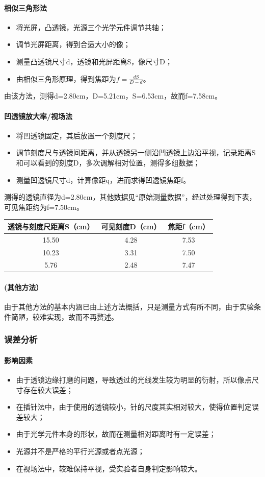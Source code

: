 \documentclass[UTF8]{ctexart}
\begin{document}
\paragraph{相似三角形法}
\begin{itemize}
\item 将光屏，凸透镜，光源三个光学元件调节共轴；
\item 调节光屏距离，得到合适大小的像；
\item 测量凸透镜尺寸d，透镜和光屏距离S，像尺寸D；
\item 由相似三角形原理，得到焦距为$f=\frac{dS}{D-d}$。
\end{itemize}
由该方法，测得d=2.80cm，D=5.21cm，S=6.53cm，故而f=7.58cm。
\paragraph{凹透镜放大率/视场法}
\begin{itemize}
\item 将凹透镜固定，其后放置一个刻度尺；
\item 调节刻度尺与透镜间距离，并从透镜另一侧沿凹透镜上边沿平视，记录距离S和可以看到的刻度D，多次调解相对位置，测得多组数据；
\item 测量凹透镜尺寸d，计算像距q，进而求得凹透镜焦距f。
\end{itemize}
测得的透镜直径为d=2.80cm，其他数据见“原始测量数据”，经过处理得到下表，可见焦距约为f=7.50cm。
\begin{table}[htbp!] 
\centering 
\begin{tabular}{|c|c|c|} 
\hline 
透镜与刻度尺距离S（cm） &  可见刻度D（cm） &焦距f（cm） \\ 
\hline 
15.50 & 4.28&7.53 \\ 
\hline 
10.23 & 3.31 &7.50\\ 
\hline 
5.76 & 2.48 &7.47 \\ 
\hline
\end{tabular} 
\end{table}
\paragraph{(其他方法）}由于其他方法的基本内涵已由上述方法概括，只是测量方式有所不同，由于实验条件简陋，较难实现，故而不再赘述。
\subsubsection{误差分析}
\paragraph{影响因素}
\begin{itemize}
\item 由于透镜边缘打磨的问题，导致透过的光线发生较为明显的衍射，所以像点尺寸存在较大误差；
\item 在插针法中，由于使用的透镜较小，针的尺度其实相对较大，使得位置判定误差较大；
\item 由于光学元件本身的形状，故而在测量相对距离时有一定误差；
\item 光源并不是严格的平行光源或者点光源；
\item 在视场法中，较难保持平视，受实验者自身判定影响较大。
\end{itemize}
\end{document}
